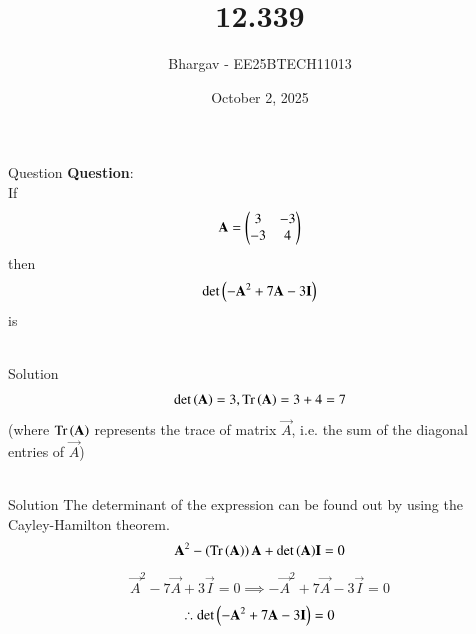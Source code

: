\documentclass{beamer}
\title{12.339}
\date{October 2, 2025}
\author{Bhargav - EE25BTECH11013}
\DeclareMathOperator{\Tr}{Tr}
\begin{document}
\frame{\titlepage}

\begin{frame}{Question}
\textbf{Question}: \\
If
\begin{align}
\mathbf{A} = \begin{pmatrix}3 & -3 \\ -3 & 4\end{pmatrix}
\end{align}
then 
\begin{align}
\det{\ensuremath{\left(-\mathbf{A}^2 + 7\mathbf{A} - 3\mathbf{I}\right)}}
\end{align}
is \\ \\
\end{frame}


\begin{frame}{Solution}
\begin{align}
\det{\brak{\vec{A}}} = 3, \Tr{\brak{\vec{A}}} = 3 + 4 = 7
\end{align}
(where $\Tr{\brak{\vec{A}}}$ represents the trace of matrix $\vec{A}$, i.e. the sum of the diagonal entries of $\vec{A}$) \\ \\ 
\end{frame}

\begin{frame}{Solution}
The determinant of the expression can be found out by using the Cayley-Hamilton theorem.\\
\begin{align}
\vec{A}^2 - \brak{\Tr{\brak{\vec{A}}}}\vec{A} + \det{\brak{\vec{A}}}\vec{I} = 0 
\end{align}
\begin{align}
\vec{A}^2 - 7\vec{A} + 3\vec{I} = 0 \implies -\vec{A}^2 + 7\vec{A} - 3\vec{I} = 0
\end{align}
\begin{align}
\therefore \det{\ensuremath{\left(-\mathbf{A}^2 + 7\mathbf{A} - 3\mathbf{I}\right)}} = 0
\end{align}
\end{frame}
\end{document}

